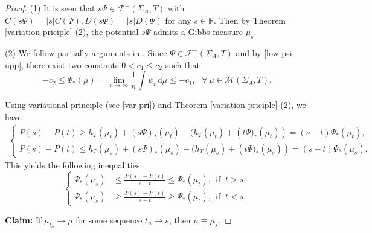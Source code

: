 \documentclass[reqno,11pt,graphicx,]{amsart}
\numberwithin{equation}{section}
\theoremstyle{plain}
\newcommand{\R}{{\mathbb R}}
\newcommand{\3}{\mathbf{3}}
\begin{document}
	\begin{proof}
		(1) It is seen that $s\Psi\in\mathcal{F}^-(\Sigma_{A},T)$ with $C(s\Psi)=|s|C(\Psi), D(s\Psi)=|s|D(\Psi)$ for any $s\in\R$. Then by Theorem \ref{variation priciple} (2), the potential $s\Psi$ admits a Gibbs measure $\mu_s$. 
		
		(2) We follow partially arguments in \cite[Theorem 2]{BD2009}. Since $\Psi\in\mathcal{F}^-(\Sigma_A,T)$ and by \eqref{low-psi-upp}, there exist two constants $0< c_1\leq c_2$ such that 
		\begin{equation}\label{Psi-bd}
			-c_2\leq\Psi_*(\mu)=\lim\limits_{n\to\infty}\frac{1}{n}\int\psi_n
 \mathrm{d}\mu\leq-c_1,\ \ \ \forall\  \mu\in\mathcal{M}(\Sigma_A,T).
		\end{equation}
		
		Using variational principle (see \eqref{var-pri}) and Theorem \ref{variation priciple} (2), we have 
		\begin{align*}
			\begin{cases}
				P(s)-P(t)\geq h_T(\mu_t)+(s\Psi)_*(\mu_t)-(h_{T}(\mu_t)+\left(t\Psi)_*(\mu_t)\right)=(s-t)\Psi_*(\mu_t),\\
				P(s)-P(t)\leq h_T(\mu_s)+(s\Psi)_*(\mu_s)-(h_{T}(\mu_s)+\left(t\Psi)_*(\mu_s)\right)=(s-t)\Psi_*(\mu_s).
			\end{cases}
		\end{align*}
		This yields the following inequalities 
		\begin{equation}\label{relatived-diff}
			\left\{\begin{aligned}
				\Psi_*(\mu_s)&\leq\frac{P(s)-P(t)}{s-t}\leq\Psi_*(\mu_t),\ \ \text{if }
				\  t>s,\\ 
				\Psi_*(\mu_s)&\geq\frac{P(s)-P(t)}{s-t}\geq\Psi_*(\mu_t),\ \
				\text{if } \  t<s. \end{aligned}\right.
		\end{equation}
		
		\noindent\textbf{Claim:} If $\mu_{t_n}\to\mu$ for
		some sequence $t_n\to s$, then $\mu\equiv\mu_s$. 
		

\end{proof}
\end{document}
